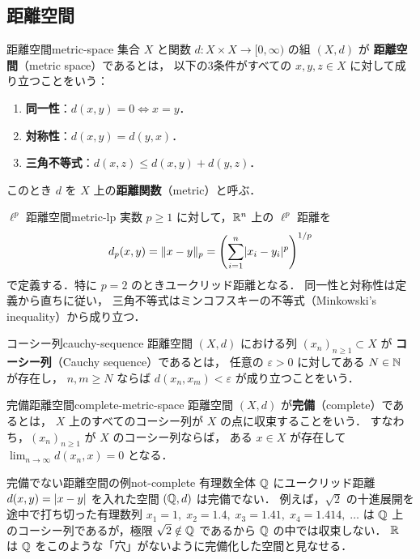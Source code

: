 \subsection{距離空間}
\label{subsec:metric-space}

\begin{definition}{距離空間}{metric-space}
  集合 $X$ と関数 $d \colon X \times X \to [0, \infty)$ の組 $(X, d)$ が
  \textbf{距離空間}（metric space）であるとは，
  以下の3条件がすべての $x, y, z \in X$ に対して成り立つことをいう：
  \begin{enumerate}
    \item \textbf{同一性}：$d(x, y) = 0 \iff x = y$．
    \item \textbf{対称性}：$d(x, y) = d(y, x)$．
    \item \textbf{三角不等式}：$d(x, z) \leq d(x, y) + d(y, z)$．
  \end{enumerate}
  このとき $d$ を $X$ 上の\textbf{距離関数}（metric）と呼ぶ．
\end{definition}

\begin{example}{$\ell^p$ 距離空間}{metric-lp}
  実数 $p \geq 1$ に対して，$\mathbb{R}^n$ 上の $\ell^p$ 距離を
  \[
    d_p(x, y) = \lVert x - y \rVert_p
    = \left(\sum_{i=1}^n \lvert x_i - y_i \rvert^p\right)^{1/p}
  \]
  で定義する．特に $p = 2$ のときユークリッド距離となる．
  同一性と対称性は定義から直ちに従い，
  三角不等式はミンコフスキーの不等式（Minkowski's inequality）から成り立つ．
\end{example}

\begin{definition}{コーシー列}{cauchy-sequence}
  距離空間 $(X, d)$ における列 $(x_n)_{n \geq 1} \subset X$ が
  \textbf{コーシー列}（Cauchy sequence）であるとは，
  任意の $\varepsilon > 0$ に対してある $N \in \mathbb{N}$ が存在し，
  $n, m \geq N$ ならば $d(x_n, x_m) < \varepsilon$ が成り立つことをいう．
\end{definition}

\begin{definition}{完備距離空間}{complete-metric-space}
  距離空間 $(X, d)$ が\textbf{完備}（complete）であるとは，
  $X$ 上のすべてのコーシー列が $X$ の点に収束することをいう．
  すなわち，$(x_n)_{n \geq 1}$ が $X$ のコーシー列ならば，
  ある $x \in X$ が存在して $\lim_{n \to \infty} d(x_n, x) = 0$ となる．
\end{definition}

\begin{remark}{完備でない距離空間の例}{not-complete}
  有理数全体 $\mathbb{Q}$ にユークリッド距離 $d(x,y) = \lvert x - y \rvert$ を入れた空間 $(\mathbb{Q}, d)$ は完備でない．
  例えば，$\sqrt{2}$ の十進展開を途中で打ち切った有理数列
  $x_1 = 1,\; x_2 = 1.4,\; x_3 = 1.41,\; x_4 = 1.414,\; \ldots$
  は $\mathbb{Q}$ 上のコーシー列であるが，極限 $\sqrt{2} \notin \mathbb{Q}$ であるから
  $\mathbb{Q}$ の中では収束しない．
  $\mathbb{R}$ は $\mathbb{Q}$ をこのような「穴」がないように完備化した空間と見なせる．
\end{remark}

